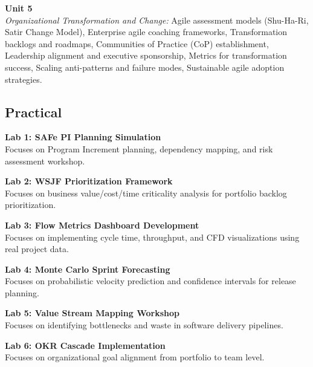 \vspace{0.3cm}

\noindent\textbf{Unit 5} \\
\textit{Organizational Transformation and Change:} Agile assessment models (Shu-Ha-Ri, Satir Change Model), Enterprise agile coaching frameworks, Transformation backlogs and roadmaps, Communities of Practice (CoP) establishment, Leadership alignment and executive sponsorship, Metrics for transformation success, Scaling anti-patterns and failure modes, Sustainable agile adoption strategies.

\newpage

\subsection*{Practical}
\noindent\textbf{Lab 1: SAFe PI Planning Simulation} \\
Focuses on Program Increment planning, dependency mapping, and risk assessment workshop.

\vspace{0.2cm}

\noindent\textbf{Lab 2: WSJF Prioritization Framework} \\
Focuses on business value/cost/time criticality analysis for portfolio backlog prioritization.

\vspace{0.2cm}

\noindent\textbf{Lab 3: Flow Metrics Dashboard Development} \\
Focuses on implementing cycle time, throughput, and CFD visualizations using real project data.

\vspace{0.2cm}

\noindent\textbf{Lab 4: Monte Carlo Sprint Forecasting} \\
Focuses on probabilistic velocity prediction and confidence intervals for release planning.

\vspace{0.2cm}

\noindent\textbf{Lab 5: Value Stream Mapping Workshop} \\
Focuses on identifying bottlenecks and waste in software delivery pipelines.

\vspace{0.2cm}

\noindent\textbf{Lab 6: OKR Cascade Implementation} \\
Focuses on organizational goal alignment from portfolio to team level.

